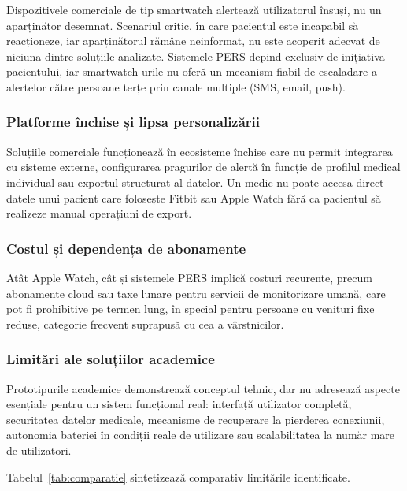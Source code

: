﻿\documentclass[12pt,a4paper,twoside]{article}
\begin{document}
Dispozitivele comerciale de tip smartwatch alertează utilizatorul însuși, nu un aparținător desemnat. Scenariul critic, în care pacientul este incapabil să reacționeze, iar aparținătorul rămâne neinformat, nu este acoperit adecvat de niciuna dintre soluțiile analizate. Sistemele PERS depind exclusiv de inițiativa pacientului, iar smartwatch-urile nu oferă un mecanism fiabil de escaladare a alertelor către persoane terțe prin canale multiple (SMS, email, push).

\subsubsection{Platforme închise și lipsa personalizării}

Soluțiile comerciale funcționează în ecosisteme închise care nu permit integrarea cu sisteme externe, configurarea pragurilor de alertă în funcție de profilul medical individual sau exportul structurat al datelor. Un medic nu poate accesa direct datele unui pacient care folosește Fitbit sau Apple Watch fără ca pacientul să realizeze manual operațiuni de export.

\subsubsection{Costul și dependența de abonamente}

Atât Apple Watch, cât și sistemele PERS implică costuri recurente, precum abonamente cloud sau taxe lunare pentru servicii de monitorizare umană, care pot fi prohibitive pe termen lung, în special pentru persoane cu venituri fixe reduse, categorie frecvent suprapusă cu cea a vârstnicilor.

\subsubsection{Limitări ale soluțiilor academice}

Prototipurile academice demonstrează conceptul tehnic, dar nu adresează aspecte esențiale pentru un sistem funcțional real: interfață utilizator completă, securitatea datelor medicale, mecanisme de recuperare la pierderea conexiunii, autonomia bateriei în condiții reale de utilizare sau scalabilitatea la număr mare de utilizatori.

Tabelul~\ref{tab:comparatie} sintetizează comparativ limitările identificate.
\end{document}
